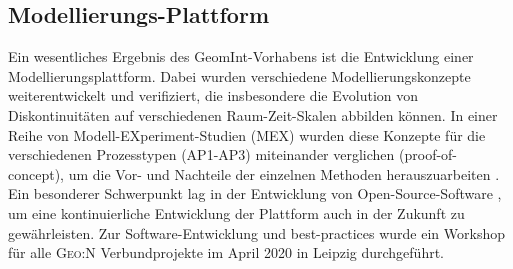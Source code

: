 \subsection*{Modellierungs-Plattform}
\label{sec:mod}

Ein wesentliches Ergebnis des GeomInt-Vorhabens ist die Entwicklung einer Modellierungsplattform. Dabei wurden verschiedene Modellierungskonzepte weiterentwickelt und verifiziert, die insbesondere die Evolution von Diskontinuitäten auf verschiedenen Raum-Zeit-Skalen abbilden können. In einer Reihe von Modell-EXperiment-Studien (MEX) wurden diese Konzepte für die verschiedenen Prozesstypen (AP1-AP3) miteinander verglichen (proof-of-concept), um die Vor- und Nachteile der einzelnen Methoden herauszuarbeiten \cite{Yoshioka2019}.
Ein besonderer Schwerpunkt lag in der Entwicklung von Open-Source-Software \cite{Bilke2019337}, um eine kontinuierliche Entwicklung der Plattform auch in der Zukunft zu gewährleisten. Zur Software-Entwicklung und \glqq best-practices\grqq{} wurde ein Workshop für alle \textsc{Geo:N} Verbundprojekte im April 2020 in Leipzig durchgeführt.
